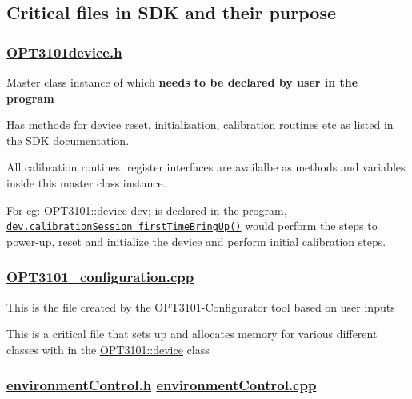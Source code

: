 \subsection*{Critical files in S\+DK and their purpose}

\subsubsection*{\mbox{\hyperlink{_o_p_t3101device_8h}{O\+P\+T3101device.\+h}}}


\begin{DoxyItemize}
\item Master class instance of which {\bfseries needs to be declared by user in the program}
\item Has methods for device reset, initialization, calibration routines etc as listed in the S\+DK documentation.
\item All calibration routines, register interfaces are availalbe as methods and variables inside this master class instance.
\item For eg\+: \mbox{\hyperlink{class_o_p_t3101_1_1device}{O\+P\+T3101\+::device}} dev; is declared in the program, \href{class_o_p_t3101_1_1device.html#a0dd8c59bc93c392f8d3f430697457415}{\tt dev.\+calibration\+Session\+\_\+first\+Time\+Bring\+Up()} would perform the steps to power-\/up, reset and initialize the device and perform initial calibration steps.
\end{DoxyItemize}

\subsubsection*{\mbox{\hyperlink{_o_p_t3101__configuration_8cpp}{O\+P\+T3101\+\_\+configuration.\+cpp}}}


\begin{DoxyItemize}
\item This is the file created by the O\+P\+T3101-\/\+Configurator tool based on user inputs
\item This is a critical file that sets up and allocates memory for various different classes with in the \mbox{\hyperlink{class_o_p_t3101_1_1device}{O\+P\+T3101\+::device}} class
\end{DoxyItemize}

\subsubsection*{\mbox{\hyperlink{environment_control_8h}{environment\+Control.\+h}} \mbox{\hyperlink{environment_control_8cpp}{environment\+Control.\+cpp}}}



